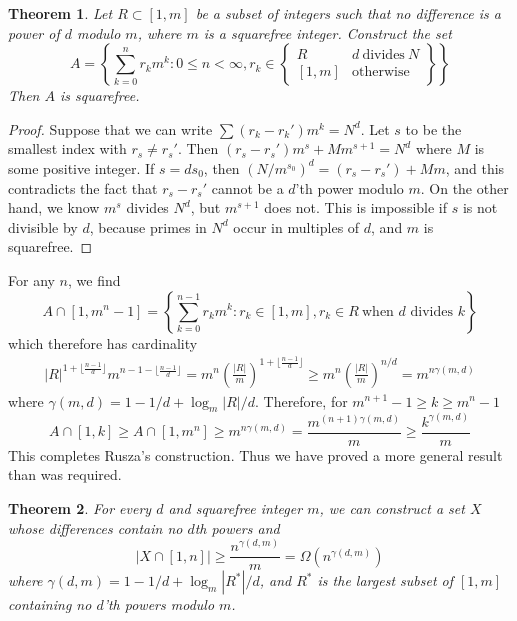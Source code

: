 \documentclass{report}
\theoremstyle{plain}
\theoremstyle{plain}
\newtheorem{theorem}{Theorem}
\begin{document}
\begin{theorem}
    Let $R \subset [1,m]$ be a subset of integers such that no difference is a power of $d$ modulo $m$, where $m$ is a {\it squarefree integer}. Construct the set
    \[ A = \left\{ \sum_{k = 0}^n r_k m^k : 0 \leq n < \infty, r_k \in \left. \begin{cases} R & d\ \text{divides}\ N\\ [1,m] & \text{otherwise} \end{cases} \right\} \right\} \]
    Then $A$ is squarefree.
\end{theorem}
\begin{proof}
    Suppose that we can write $\sum (r_k - r_k') m^k = N^d$. Let $s$ to be the smallest index with $r_s \neq r_s'$. Then $(r_s - r_s') m^s + M m^{s+1} = N^d$ where $M$ is some positive integer. If $s = ds_0$, then $(N/m^{s_0})^d = (r_s - r_s') + M m$, and this contradicts the fact that $r_s - r_s'$ cannot be a $d$'th power modulo $m$. On the other hand, we know $m^s$ divides $N^d$, but $m^{s+1}$ does not. This is impossible if $s$ is not divisible by $d$, because primes in $N^d$ occur in multiples of $d$, and $m$ is squarefree.
\end{proof}

For any $n$, we find
%
\[ A \cap [1,m^n - 1] = \left\{ \sum_{k = 0}^{n-1} r_km^k : r_k \in [1,m], r_k \in R\ \text{when $d$ divides $k$} \right\} \]
%
which therefore has cardinality
%
\begin{align*}
    |R|^{1 + \lfloor \frac{n-1}{d} \rfloor} m^{n-1- \lfloor \frac{n-1}{d} \rfloor} = m^n \left( \frac{|R|}{m} \right)^{1 + \lfloor \frac{n-1}{d} \rfloor} \geq m^n \left( \frac{|R|}{m} \right)^{n/d} = m^{n \gamma(m,d)}
\end{align*}
%
where $\gamma(m,d) = 1 - 1/d + \log_m |R|/d$. Therefore, for $m^{n+1} - 1 \geq k \geq m^n - 1$
%
\[ A \cap [1,k] \geq A \cap [1,m^n] \geq m^{n \gamma(m,d)} = \frac{m^{(n+1) \gamma(m,d)}}{m} \geq \frac{k^{\gamma(m,d)}}{m} \]
%
This completes Rusza's construction. Thus we have proved a more general result than was required.

\begin{theorem}
    For every $d$ and squarefree integer $m$, we can construct a set $X$ whose differences contain no $d$th powers and
    \[ |X \cap [1,n]| \geq \frac{n^{\gamma(d,m)}}{m} = \Omega(n^{\gamma(d,m)}) \]
    where $\gamma(d,m) = 1 - 1/d + \log_m |R^*|/d$, and $R^*$ is the largest subset of $[1,m]$ containing no $d$'th powers modulo $m$.
\end{theorem}
\end{document}
